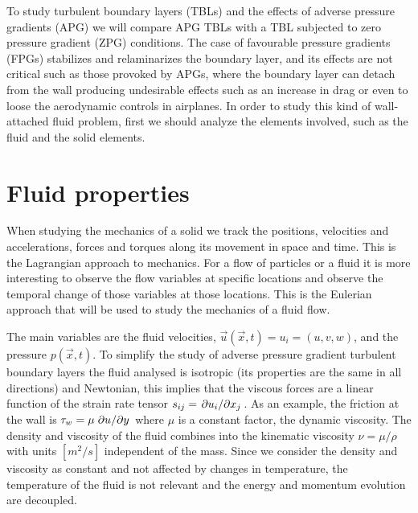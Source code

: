 To study turbulent boundary layers (TBLs) and the effects of adverse pressure gradients (APG) we will compare APG TBLs with a TBL subjected to zero pressure gradient (ZPG) conditions. The case of favourable pressure gradients (FPGs) stabilizes and relaminarizes the boundary layer, and its effects are not critical such as those provoked by APGs, where the boundary layer can detach from the wall producing undesirable effects such as an increase in drag or even to loose the aerodynamic controls in airplanes.
In order to study this kind of wall-attached fluid problem, first we should analyze the elements involved, such as the fluid and the solid elements.

\section{Fluid properties}

When studying the mechanics of a solid we track the positions, velocities and accelerations, forces and torques along its movement in space and time. This is the Lagrangian approach to mechanics.
For a flow of particles or a fluid it is more interesting to observe the flow variables at specific locations and observe the temporal change of those variables at those locations. This is the Eulerian approach that will be used to study the mechanics of a fluid flow. 

The main variables are the fluid velocities, $\vec{u}(\vec{x},t)=u_i=(u,v,w)$, and the pressure $p(\vec{x},t)$.
To simplify the study of adverse pressure gradient turbulent boundary layers the fluid analysed is isotropic (its properties are the same in all directions) and Newtonian, this implies that the viscous forces are a linear function of the strain rate tensor $s_{ij}=\pdv{u_i}/{x_j}$. As an example, the friction at the wall is $\tau_w=\mu \pdv{u}/{y}$
where $\mu$ is a constant factor, the dynamic viscosity.
The density and viscosity of the fluid combines into the kinematic viscosity $\nu=\mu/\rho$ with units $[m^2/s]$ independent of the mass. 
Since we consider the density and viscosity as constant and not affected by changes in temperature, the temperature of the fluid is not relevant and the energy and momentum evolution are decoupled.


